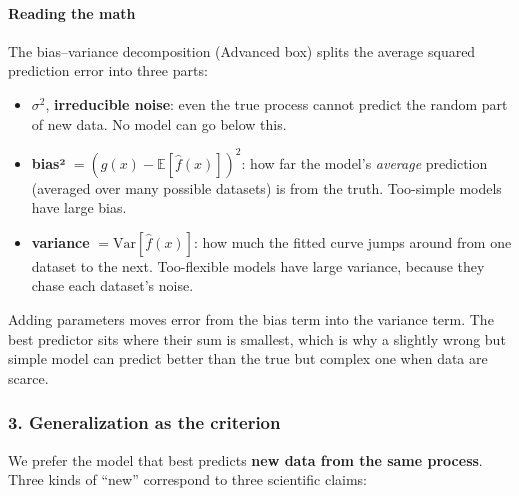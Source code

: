 \paragraph{Reading the math}

The bias--variance decomposition (Advanced box) splits the average
squared prediction error into three parts:

\begin{itemize}
\tightlist
\item
  \(\sigma^2\), \textbf{irreducible noise}: even the true process cannot
  predict the random part of new data. No model can go below this.
\item
  \textbf{bias²} \(= (g(x) - \mathbb{E}[\hat f(x)])^2\): how far the
  model's \emph{average} prediction (averaged over many possible
  datasets) is from the truth. Too-simple models have large bias.
\item
  \textbf{variance} \(= \mathrm{Var}[\hat f(x)]\): how much the fitted
  curve jumps around from one dataset to the next. Too-flexible models
  have large variance, because they chase each dataset's noise.
\end{itemize}

Adding parameters moves error from the bias term into the variance term.
The best predictor sits where their sum is smallest, which is why a
slightly wrong but simple model can predict better than the true but
complex one when data are scarce.

\subsubsection{3. Generalization as the criterion}

We prefer the model that best predicts \textbf{new data from the same
process}. Three kinds of ``new'' correspond to three scientific claims:

